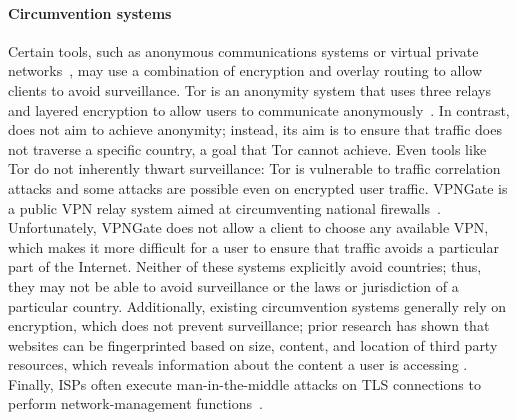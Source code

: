 \paragraph{Circumvention systems}  Certain tools, such as anonymous
communications systems or virtual private networks~\cite{dingledine2004tor,nobori2014vpn,piotrowska2017loopix,van2015vuvuzela,wolinsky2012dissen,tyagi2016stadium,corrigan2015riposte,kwon2016atom,kwon2016riffle,gelernter2016two}, may use a combination of
encryption and overlay routing to allow clients to avoid surveillance. Tor is
an anonymity system that uses three relays and layered encryption to allow
users to communicate anonymously~\cite{dingledine2004tor}.  In contrast,
\system{} does not aim to achieve anonymity; instead, its aim is to ensure
that traffic does not traverse a specific  country, a goal that Tor cannot
achieve.  Even tools like Tor do not inherently thwart surveillance: Tor is
vulnerable to traffic correlation attacks and some attacks are possible even
on encrypted user traffic. VPNGate is a public VPN relay system aimed at
circumventing national firewalls~\cite{nobori2014vpn}. Unfortunately, VPNGate
does not allow a client to choose any available VPN, which makes it more
difficult for a user to ensure that traffic avoids a particular part of the
Internet.  Neither of these systems explicitly avoid countries; thus, they may
not  be able to avoid surveillance or the laws or jurisdiction of a particular
country. Additionally, existing circumvention systems generally rely on
encryption, which does not prevent surveillance; prior research has shown that
websites can be fingerprinted based on size, content, and location of third
party resources, which  reveals information about the content a user is
accessing \cite{what_isps_can_see}.  Finally, ISPs often execute man-in-the-middle attacks on TLS connections to perform network-management
functions~\cite{mitm_isp}.

